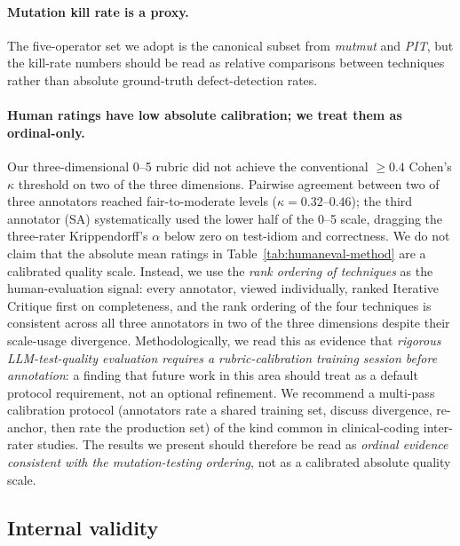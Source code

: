 \documentclass[smallextended]{svjour3}
\begin{document}
\paragraph{Mutation kill rate is a proxy.}
The five-operator set we adopt is the canonical subset from
\emph{mutmut} and \emph{PIT}, but the kill-rate numbers should be
read as relative comparisons between techniques rather than absolute
ground-truth defect-detection rates.

\paragraph{Human ratings have low absolute calibration; we treat
them as ordinal-only.}
Our three-dimensional 0--5 rubric did not achieve the conventional
$\geq 0.4$ Cohen's $\kappa$ threshold on two of the three
dimensions. Pairwise agreement between two of three annotators
reached fair-to-moderate levels ($\kappa = 0.32$--$0.46$); the
third annotator (SA) systematically used the lower half of the
0--5 scale, dragging the three-rater Krippendorff's $\alpha$ below
zero on test-idiom and correctness. We do not claim that the
absolute mean ratings in Table~\ref{tab:humaneval-method} are a
calibrated quality scale. Instead, we use the \emph{rank ordering
of techniques} as the human-evaluation signal: every annotator,
viewed individually, ranked Iterative Critique first on completeness,
and the rank ordering of the four techniques is consistent across all
three annotators in two of the three dimensions despite their
scale-usage divergence. Methodologically, we read this as evidence
that \emph{rigorous LLM-test-quality evaluation requires a
rubric-calibration training session before annotation}: a finding
that future work in this area should treat as a default protocol
requirement, not an optional refinement. We recommend a
multi-pass calibration protocol (annotators rate a shared training
set, discuss divergence, re-anchor, then rate the production set)
of the kind common in clinical-coding inter-rater studies. The
results we present should therefore be read as \emph{ordinal
evidence consistent with the mutation-testing ordering}, not as a
calibrated absolute quality scale.

\subsection{Internal validity}\label{sec:limitations-internal}
\end{document}
